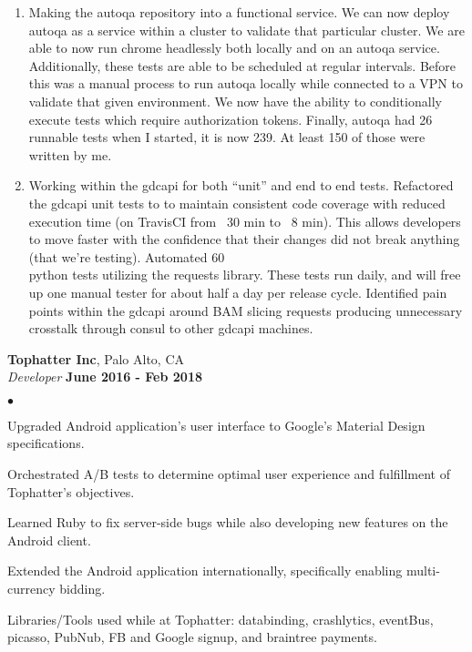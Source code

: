 \documentclass[margin,line]{res}
\newenvironment{list2}{
  \begin{list}{$\bullet$}{
      \setlength{\itemsep}{0in}
      \setlength{\parsep}{0in} \setlength{\parskip}{0in}
      \setlength{\topsep}{0in} \setlength{\partopsep}{0in} 
      \setlength{\leftmargin}{0.2in}}}{\end{list}}
\begin{document}
\begin{resume}
\begin{enumerate}
  \item Making the autoqa repository into a functional service. We can now deploy autoqa as a service within
a cluster to validate that particular cluster. We are able to now run chrome headlessly both locally and on
an autoqa service. Additionally, these tests are able to be scheduled at regular intervals. Before this was
a manual process to run autoqa locally while connected to a VPN to validate that given environment. We
now have the ability to conditionally execute tests which require authorization tokens. Finally, autoqa had
26 runnable tests when I started, it is now 239. At least 150 of those were written by me.
  \item Working within the gdcapi for both “unit” and end to end tests. Refactored the gdcapi unit tests to to
maintain consistent code coverage with reduced execution time (on TravisCI from ~30 min to ~8 min).
This allows developers to move faster with the confidence that their changes did not break anything (that
we’re testing). Automated 60\\%
python tests utilizing the requests library. These tests run daily, and will free up one manual tester for
about half a day per release cycle. Identified pain points within the gdcapi around BAM slicing requests
producing unnecessary crosstalk through consul to other gdcapi machines.
\end{enumerate}

    {\bf Tophatter Inc}, Palo Alto, CA\\
    {\em Developer} \hfill {\bf June 2016 - Feb 2018}\\
  \begin{list2}
    \item  Upgraded Android application’s user interface to Google’s Material Design specifications. 
    \item  Orchestrated A/B tests to determine optimal user experience and fulfillment of Tophatter’s objectives. 
    \item  Learned Ruby to fix server-side bugs while also developing new features on the Android client.
    \item  Extended the Android application internationally, specifically enabling multi-currency bidding.
    \item  Libraries/Tools used while at Tophatter: databinding, crashlytics, eventBus, picasso, PubNub, FB and Google signup, and braintree payments. 
  \end{list2}


\end{resume}
\end{document}
